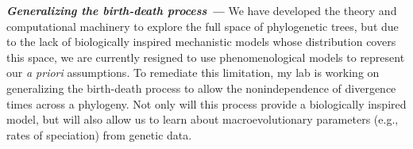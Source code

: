 \textit{\textbf{Generalizing the birth-death process ---}}
We have developed the theory and computational machinery to explore
the full space of phylogenetic trees, but due to the lack
of biologically inspired mechanistic models whose distribution covers
this space, we are currently resigned to use phenomenological models
to represent our \emph{a priori} assumptions.
To remediate this limitation, my lab is working on generalizing the birth-death
process to allow the nonindependence of divergence times across a phylogeny.
Not only will this process provide a biologically inspired model, but will also
allow us to learn about macroevolutionary parameters (e.g., rates of
speciation) from genetic data.


